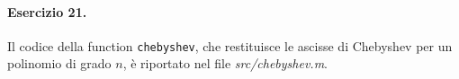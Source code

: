\paragraph{Esercizio 21.} Il codice della function \verb|chebyshev|, che restituisce le ascisse di Chebyshev per un polinomio di grado $n$, è riportato nel file \emph{src/chebyshev.m}.